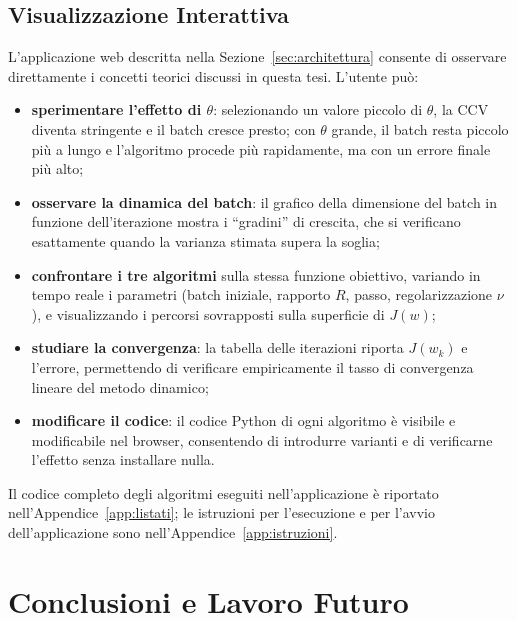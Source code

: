 \documentclass[a4paper,12pt]{article}
\numberwithin{equation}{section}
\numberwithin{figure}{section}
\numberwithin{table}{section}
\begin{document}
\subsection{Visualizzazione Interattiva}\label{sec:visualizzazione}

L'applicazione web descritta nella Sezione~\ref{sec:architettura} consente
di osservare direttamente i concetti teorici discussi in questa tesi.
L'utente può:

\begin{itemize}
  \item \textbf{sperimentare l'effetto di $\theta$}: selezionando un valore
  piccolo di $\theta$, la CCV diventa stringente e il batch cresce presto; con
  $\theta$ grande, il batch resta piccolo più a lungo e l'algoritmo procede
  più rapidamente, ma con un errore finale più alto;
  \item \textbf{osservare la dinamica del batch}: il grafico della dimensione
  del batch in funzione dell'iterazione mostra i ``gradini'' di crescita,
  che si verificano esattamente quando la varianza stimata supera la soglia;
  \item \textbf{confrontare i tre algoritmi} sulla stessa funzione obiettivo,
  variando in tempo reale i parametri (batch iniziale, rapporto $R$, passo,
  regolarizzazione $\nu$), e visualizzando i percorsi sovrapposti sulla
  superficie di $J(w)$;
  \item \textbf{studiare la convergenza}: la tabella delle iterazioni riporta
  $J(w_k)$ e l'errore, permettendo di verificare empiricamente il tasso di
  convergenza lineare del metodo dinamico;
  \item \textbf{modificare il codice}: il codice Python di ogni algoritmo è
  visibile e modificabile nel browser, consentendo di introdurre varianti e di
  verificarne l'effetto senza installare nulla.
\end{itemize}

Il codice completo degli algoritmi eseguiti nell'applicazione è riportato
nell'Appendice~\ref{app:listati}; le istruzioni per l'esecuzione e per
l'avvio dell'applicazione sono nell'Appendice~\ref{app:istruzioni}.


\section{Conclusioni e Lavoro Futuro}\label{sec:conclusioni}
\end{document}
